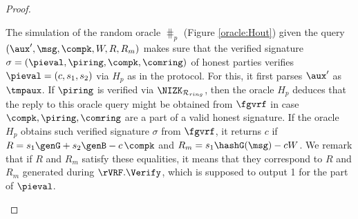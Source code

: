 \begin{proof}
\begin{itemize}
		The simulation of the random oracle $ \hash_p $ (Figure \ref{oracle:Hout}) given the query $ (\aux', \msg,\compk,W,R,R_m)  $ makes sure that the verified signature $ \sigma = (\pieval, \piring, \compk, \comring) $ of honest parties verifies $ \pieval = (c, s_1,s_2) $ via $ H_p $ as in the protocol. For this, it first parses $ \aux' $ as $\tmpaux $.  If $ \piring $ is verified via $ \NIZK_{\mathcal{R}_{ring}} $, then the oracle $ H_p $ deduces that the reply to this oracle query might be obtained from $ \fgvrf $ in case $ \compk,\piring,\comring $ are  a part of a valid honest signature.
		 If the oracle $ H_p $ obtains such verified signature $ \sigma $ from $ \fgvrf $, it returns $ c $ if $ R = s_1 \genG + s_2 \genB - c \,\compk $ and $ R_m = s_1 \hashG(\msg) - cW $. We remark that if $ R $ and $ R_m $ satisfy these equalities, it means that they correspond to $ R $ and $ R_m $ generated during $ \rVRF.\Verify $, which is supposed to output 1  for the part of $ \pieval $.
		 
		
		
		\begin{figure}
			\centering
			\scriptsize
			\noindent{}
\end{figure}
\end{itemize}
\end{proof}
